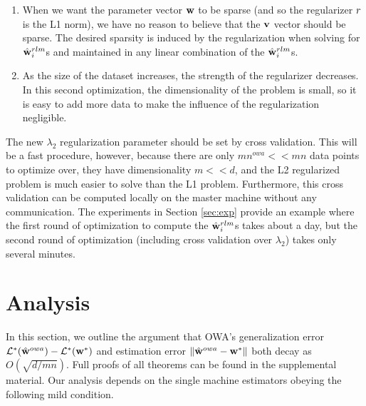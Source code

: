 \documentclass[thesis.tex]{subfiles}
\newcommand{\nowa}{n^{\textit{owa}}}
\begin{document}
\vspace{-0.05in}
\begin{enumerate}[leftmargin=0.15in]
\item
When we want the parameter vector $\mathbf w$ to be sparse 
(and so the regularizer $r$ is the L1 norm), 
we have no reason to believe that the $\mathbf{v}$ vector should be sparse.
The desired sparsity is induced by the regularization when solving for $\hat{\mathbf w}^{rlm}_i$s and maintained in any linear combination of the $\hat{\mathbf w}^{rlm}_i$s.
\item
As the size of the dataset increases, the strength of the regularizer decreases.
In this second optimization, the dimensionality of the problem is small,
so it is easy to add more data to make the influence of the regularization negligible.
\end{enumerate}

\vspace{-0.05in}
The new $\lambda_2$ regularization parameter should be set by cross validation.
This will be a fast procedure, however, because there are only $m\nowa <\!\!< mn$ data points to optimize over,
they have dimensionality $m<\!\!<d$,
and the L2 regularized problem is much easier to solve than the L1 problem.
Furthermore, this cross validation can be computed locally on the master machine without any communication.
The experiments in Section \ref{sec:exp} provide an example where the first round of optimization to compute the $\hat{\mathbf w}^{rlm}_i$s takes about a day, but the second round of optimization (including cross validation over $\lambda_2$) takes only several minutes.


\section{Analysis}
\label{sec:anal}
\label{sec:owa:proofs}

In this section, we outline the argument that OWA's generalization error $\mathcal{L}^*(\hat{\mathbf w}^{owa})-\mathcal{L}^*({\mathbf w^{*}})$ and estimation error ${\lVert {\hat{\mathbf w}^{owa}-{\mathbf w^{*}}} \rVert}$ both decay as $O(\sqrt{d/mn})$.
Full proofs of all theorems can be found in the supplemental material.
%
Our analysis depends on the single machine estimators obeying the following mild condition.
\end{document}
